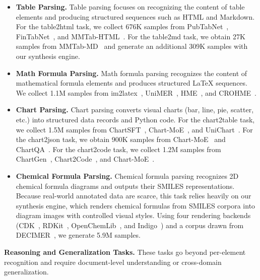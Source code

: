 \begin{itemize}[leftmargin=1.0em, labelsep=0.5em]
    \item \textbf{Table Parsing.} Table parsing focuses on recognizing the content of table elements and producing structured sequences such as HTML and Markdown. For the table2html task, we collect 676K samples from PubTabNet~\cite{pubtabnet}, FinTabNet~\cite{fintabnet}, and MMTab-HTML~\cite{mmtab}. For the table2md task, we obtain 27K samples from MMTab-MD~\cite{mmtab} and generate an additional 309K samples with our synthesis engine.

    \item \textbf{Math Formula Parsing.} Math formula parsing recognizes the content of mathematical formula elements and produces structured LaTeX sequences. We collect 1.1M samples from im2latex~\cite{im2latex}, UniMER~\cite{unimernet}, HME~\cite{hme100k}, and CROHME~\cite{crohme}.

    \item \textbf{Chart Parsing.} Chart parsing converts visual charts (bar, line, pie, scatter, etc.) into structured data records and Python code. For the chart2table task, we collect 1.5M samples from ChartSFT~\cite{chartsft}, Chart-MoE~\cite{chartmoe}, and UniChart~\cite{unichart}. For the chart2json task, we obtain 900K samples from Chart-MoE~\cite{chartmoe} and ChartQA~\cite{chartqa}. For the chart2code task, we collect 1.2M samples from ChartGen~\cite{chartgen}, Chart2Code~\cite{chart2code}, and Chart-MoE~\cite{chartmoe}.

    \item \textbf{Chemical Formula Parsing.} Chemical formula parsing recognizes 2D chemical formula diagrams and outputs their SMILES representations. Because real-world annotated data are scarce, this task relies heavily on our synthesis engine, which renders chemical formulas from SMILES corpora into diagram images with controlled visual styles. Using four rendering backends (CDK~\cite{cdk}, RDKit~\cite{rdkit}, OpenChemLib~\cite{openchemlib}, and Indigo~\cite{indigo}) and a corpus drawn from DECIMER~\cite{decimer}, we generate 5.9M samples.
\end{itemize}

\textbf{Reasoning and Generalization Tasks.} These tasks go beyond per-element recognition and require document-level understanding or cross-domain generalization.

